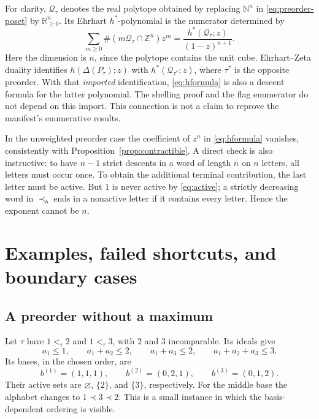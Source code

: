 \documentclass[11pt]{article}
\numberwithin{equation}{section}
\theoremstyle{definition}
\theoremstyle{remark}
\newcommand{\N}{\mathbb N}
\newcommand{\Z}{\mathbb Z}
\newcommand{\R}{\mathbb R}
\begin{document}
For clarity, $\mathcal Q_\tau$ denotes the real polytope obtained by
replacing $\N^n$ in \eqref{eq:preorder-poset} by $\R_{\ge0}^n$.
Its Ehrhart $h^*$-polynomial is the numerator determined by
\[
 \sum_{m\ge0}\#(m\mathcal Q_\tau\cap\Z^n)z^m
       =\frac{h^*(\mathcal Q_\tau;z)}{(1-z)^{n+1}}.
\]
Here the dimension is $n$, since the polytope contains the unit cube.
Ehrhart--Zeta duality \cite[Theorem~1.5 and the proof of Proposition~4.5]{AC}
identifies $h(\Delta(P_\tau);z)$ with $h^*(\mathcal Q_{\tau^*};z)$, where
$\tau^*$ is the opposite preorder. With that \emph{imported} identification,
\eqref{eq:hformula} is also a descent formula for the latter polynomial.
The shelling proof and the flag enumerator do not depend on this import.
This connection is not a claim to reprove the manifest's enumerative results.

In the unweighted preorder case the coefficient of $z^n$ in
\eqref{eq:hformula} vanishes, consistently with
Proposition~\ref{prop:contractible}. A direct check is also instructive: to
have $n-1$ strict descents in a word of length $n$ on $n$ letters, all letters
must occur once. To obtain the additional terminal contribution, the last
letter must be active. But $1$ is never active by \eqref{eq:active}; a strictly
decreasing word in $\prec_b$ ends in a nonactive letter if it contains every
letter. Hence the exponent cannot be $n$.

\section{Examples, failed shortcuts, and boundary cases}
\label{sec:examples}

\subsection{A preorder without a maximum}

Let $\tau$ have $1<_\tau2$ and $1<_\tau3$, with $2$ and $3$ incomparable.
Its ideals give
\[
 a_1\le1,\qquad a_1+a_2\le2,\qquad a_1+a_3\le2,
 \qquad a_1+a_2+a_3\le3.
\]
Its bases, in the chosen order, are
\[
 b^{(1)}=(1,1,1),\qquad b^{(2)}=(0,2,1),\qquad b^{(3)}=(0,1,2).
\]
Their active sets are $\varnothing$, $\{2\}$, and $\{3\}$, respectively.
For the middle base the alphabet changes to $1\prec3\prec2$. This is a small
instance in which the basis-dependent ordering is visible.

\begin{table}[htbp]
\centering\small

\caption{The complete shelling for the three-element preorder with
$1<2$ and $1<3$. Base strings denote coordinate vectors.}
\label{tab:worked}
\end{table}
\end{document}
